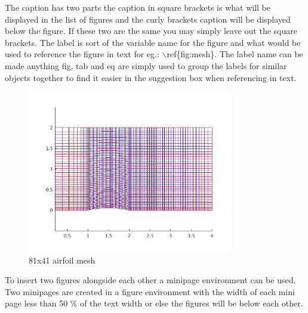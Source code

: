 \documentclass[a4paper,12pt]{article}
\begin{document}
The caption has two parts the caption in square brackets is what will be displayed in the list of figures and the curly brackets caption will be displayed below the figure. If these two are the same you may simply leave out the square brackets. The label is sort of the variable name for the figure and what would be used to reference the figure in text for eg.: $\backslash$ref\{fig:mesh\}. The label name can be made anything fig, tab and eq are simply used to group the labels for similar objects together to find it easier in the suggestion box when referencing in text.

\begin{figure}[!htbp]
\centering
\includegraphics[width= 0.8\textwidth]{Figures/Meshc.jpg}
\caption[81x41 airfoil mesh]{81x41 airfoil mesh}
\label{fig:mesh}
\end{figure}

To insert two figures alongside each other a minipage environment can be used. Two minipages are created in a figure environment with the width of each mini page less than 50 \% of the text width or else the figures will be below each other.
\end{document}
